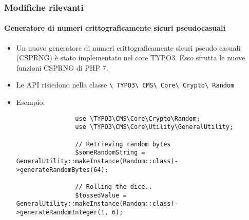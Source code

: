 \begin{frame}[fragile]
	\frametitle{Modifiche rilevanti}
	\framesubtitle{Generatore di numeri crittograficamente sicuri pseudocasuali}

	\lstset{basicstyle=\tiny\ttfamily}

	\begin{itemize}

		\item Un nuovo generatore di numeri crittograficamente sicuri pseudo casuali (CSPRNG) è stato
			implementato nel core TYPO3.\newline
			Esso sfrutta le nuove funzioni CSPRNG di PHP 7.

		\item Le API risiedono nella classe
			\texttt{\textbackslash
				TYPO3\textbackslash
				CMS\textbackslash
				Core\textbackslash
				Crypto\textbackslash
				Random}

		\item Esempio:

			\begin{lstlisting}
				use \TYPO3\CMS\Core\Crypto\Random;
				use \TYPO3\CMS\Core\Utility\GeneralUtility;

				// Retrieving random bytes
				$someRandomString = GeneralUtility::makeInstance(Random::class)->generateRandomBytes(64);

				// Rolling the dice..
				$tossedValue = GeneralUtility::makeInstance(Random::class)->generateRandomInteger(1, 6);
			\end{lstlisting}

	\end{itemize}

\end{frame}

